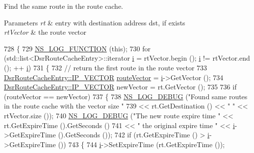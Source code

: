 Find the same route in the route cache. 


\begin{DoxyParams}{Parameters}
{\em rt} & entry with destination address dst, if exists \\
\hline
{\em rt\+Vector} & the route vector \\
\hline
\end{DoxyParams}

\begin{DoxyCode}
728 \{
729   \hyperlink{log-macros-disabled_8h_a90b90d5bad1f39cb1b64923ea94c0761}{NS\_LOG\_FUNCTION} (\textcolor{keyword}{this});
730   \textcolor{keywordflow}{for} (std::list<DsrRouteCacheEntry>::iterator \hyperlink{bernuolliDistribution_8m_a6f6ccfcf58b31cb6412107d9d5281426}{i} = rtVector.begin (); \hyperlink{bernuolliDistribution_8m_a6f6ccfcf58b31cb6412107d9d5281426}{i} != rtVector.end (); ++
      \hyperlink{bernuolliDistribution_8m_a6f6ccfcf58b31cb6412107d9d5281426}{i})
731     \{
732       \textcolor{comment}{// return the first route in the route vector}
733       \hyperlink{classns3_1_1dsr_1_1DsrRouteCacheEntry_ab834177006bdbfd2e3fa607c2a88cbdf}{DsrRouteCacheEntry::IP\_VECTOR} \hyperlink{classns3_1_1dsr_1_1DsrRouteCache_a055f612eb8c2e05b634db24523adb1e5}{routeVector} = 
      \hyperlink{bernuolliDistribution_8m_a6f6ccfcf58b31cb6412107d9d5281426}{i}->GetVector ();
734       \hyperlink{classns3_1_1dsr_1_1DsrRouteCacheEntry_ab834177006bdbfd2e3fa607c2a88cbdf}{DsrRouteCacheEntry::IP\_VECTOR} newVector = rt.GetVector ();
735 
736       \textcolor{keywordflow}{if} (routeVector == newVector)
737         \{
738           \hyperlink{group__logging_ga413f1886406d49f59a6a0a89b77b4d0a}{NS\_LOG\_DEBUG} (\textcolor{stringliteral}{"Found same routes in the route cache with the vector size "}
739                         << rt.GetDestination () << \textcolor{stringliteral}{" "} << rtVector.size ());
740           \hyperlink{group__logging_ga413f1886406d49f59a6a0a89b77b4d0a}{NS\_LOG\_DEBUG} (\textcolor{stringliteral}{"The new route expire time "} << rt.GetExpireTime ().GetSeconds ()
741                                                      << \textcolor{stringliteral}{" the original expire time "} << 
      \hyperlink{bernuolliDistribution_8m_a6f6ccfcf58b31cb6412107d9d5281426}{i}->GetExpireTime ().GetSeconds ());
742           \textcolor{keywordflow}{if} (rt.GetExpireTime () > \hyperlink{bernuolliDistribution_8m_a6f6ccfcf58b31cb6412107d9d5281426}{i}->GetExpireTime ())
743             \{
744               \hyperlink{bernuolliDistribution_8m_a6f6ccfcf58b31cb6412107d9d5281426}{i}->SetExpireTime (rt.GetExpireTime ());

\end{DoxyCode}
